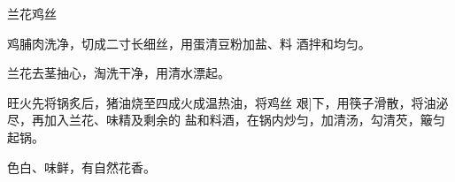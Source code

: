 \begin{recipe}{兰花鸡丝}

\ingredients


\cooking

\step 鸡脯肉洗净，切成二寸长细丝，用蛋清豆粉加盐、料 酒拌和均匀。

\step 兰花去茎抽心，淘洗干净，用清水漂起。

\step 旺火先将锅炙后，猪油烧至四成火成温热油，将鸡丝 艰]下，用筷子滑散，将油泌尽，再加入兰花、味精及剩余的 盐和料酒，在锅内炒匀，加清汤，勾清芡，簸匀起锅。

\notes

色白、味鲜，有自然花香。

\end{recipe}

